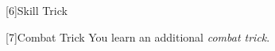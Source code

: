         [6]{Skill Trick} %

        [7]{Combat Trick}
        You learn an additional \textit{combat trick}.







\newpage
